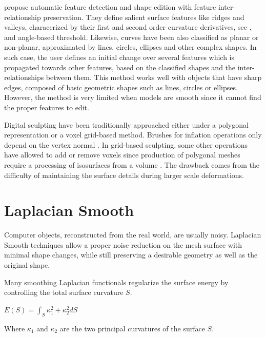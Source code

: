 \documentclass[10pt, conference]{IEEEtran}
\begin{document}
\cite{Gal2009} propose automatic feature detection and shape edition
with feature inter-relationship preservation. They define salient
surface features like ridges and valleys, characerized by their first
and second order curvature derivatives, see \cite{Ohtake2004}, and angle-based
threshold. Likewise, curves have been also classified as planar or
non-planar, approximated by lines, circles, ellipses and other complex
shapes. In such case, the user defines an initial change over several
features which is propagated towards other features, based on the
classified shapes and the inter-relationships between them. This method
works well with objects that have sharp edges, composed of basic geometric
shapes such as lines, circles or ellipses. However, the method is
very limited when models are smooth since it cannot find the proper
features to edit.

Digital sculpting have been traditionally approached either under
a polygonal representation or a voxel grid-based method. Brushes for
inflation operations only depend on the vertex normal \cite{Stanculescu2011}.
In grid-based sculpting, some other operations have allowed to add
or remove voxels since production of polygonal meshes require a processing
of isosurfaces from a volume \cite{Galyean1991}. The drawback comes
from the difficulty of maintaining the surface details during larger
scale deformations. 

\section{Laplacian Smooth\label{sec:Laplacian-Smooth}}

Computer objects, reconstructed from the real world, are usually noisy.
Laplacian Smooth techniques allow a proper noise reduction on the
mesh surface with minimal shape changes, while still preserving a
desirable geometry as well as the original shape. 

Many smoothing Laplacian functionals regularize the surface energy
by controlling the total surface curvature $S$.

\begin{center}
$E\left(S\right)=\int_{S}\kappa_{1}^{2}+\kappa_{2}^{2}dS$
\par\end{center}


Where $\kappa_{1}$ and $\kappa_{2}$ are the two principal curvatures
of the surface $S$.
\end{document}
